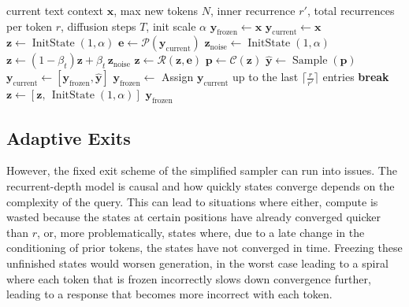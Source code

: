 \documentclass{article} %
\theoremstyle{definition}
\theoremstyle{plain}
\DeclareMathOperator{\Sample}{Sample}
\DeclareMathOperator{\InitState}{InitState}
\begin{document}
\begin{algorithm}[t]
\caption{Diffusion-forcing-style generation, simplified version (Full Version in \cref{alg:latent_diff_freeze})}
\label{alg:simple_diffusion}
\begin{algorithmic}[1]
\small
\Require current text context $\mathbf{x}$, max new tokens $N$, inner recurrence $r'$, total recurrences per token $r$, diffusion steps $T$, init scale $\alpha$
\State \(\mathbf{y}_{\mathrm{frozen}} \leftarrow \mathbf{x}\)
\State \(\mathbf{y}_{\mathrm{current}} \leftarrow \mathbf{x}\)
\State \(\mathbf{z} \leftarrow \InitState(1,\alpha)\)
    \State \(\mathbf{e}\leftarrow \mathcal{P}(\mathbf{y}_{\mathrm{current}})\) 
    \State \(\mathbf{z}_{\text{noise}} \leftarrow \InitState(1,\alpha)\)
    \State \(\mathbf{z}\leftarrow (1-\beta_t)\mathbf{z} + \beta_t\,\mathbf{z}_{\text{noise}}\)
        \State \(\mathbf{z}\leftarrow \mathcal{R}(\mathbf{z},\mathbf{e})\) 
    \EndFor
    \State \(\mathbf{p}\leftarrow \mathcal{C}(\mathbf{z})\) 
    \State \(\hat{\mathbf{y}}\leftarrow \Sample(\mathbf{p})\) 
    \State $\mathbf{y}_{\mathrm{current}} \leftarrow [\mathbf{y}_{\mathrm{frozen}}, \hat{\mathbf{y}}]$
    \State \(\mathbf{y}_{\mathrm{frozen}} \leftarrow \) Assign $\mathbf{y}_{\mathrm{current}}$ up to the last $\lceil{\frac{r}{r'}}\rceil$ entries 
     \textbf{break} \EndIf
    \State \(\mathbf{z}\leftarrow [\mathbf{z},\,\InitState(1,\alpha)]\) 
\EndFor
\State \Return \(\mathbf{y}_{\mathrm{frozen}}\) %
\end{algorithmic}
\end{algorithm}


\subsection{Adaptive Exits}


 However, the fixed exit scheme of the simplified sampler can run into issues. The recurrent-depth model is causal and how quickly states converge depends on the complexity of the query. This can lead to situations where either, compute is wasted because the states at certain positions have already converged quicker than $r$, or, more problematically, states where, due to a late change in the conditioning of prior tokens, the states have not converged in time. Freezing these unfinished states would worsen generation, in the worst case leading to a spiral where each token that is frozen incorrectly slows down convergence further, leading to a response that becomes more incorrect with each token.
\end{document}
